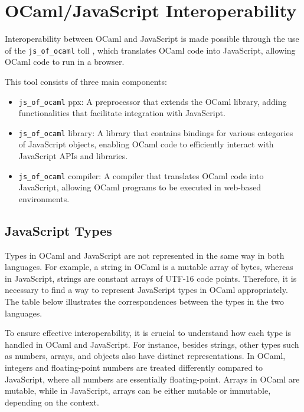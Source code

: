 \section{OCaml/JavaScript Interoperability}
\label{sec:ocaml_javascript_interoperability}


Interoperability between OCaml and JavaScript is made possible through the use of the \texttt{js\_of\_ocaml} toll \cite{demange2012} ,
which translates OCaml code into JavaScript, allowing OCaml code to run in a browser.

This tool consists of three main components:

\begin{itemize}
    \item \texttt{js\_of\_ocaml} ppx: A preprocessor that extends the OCaml library, adding functionalities that facilitate integration with JavaScript.
    \item \texttt{js\_of\_ocaml} library: A library that contains bindings for various categories of JavaScript objects, enabling OCaml code to efficiently interact with JavaScript APIs and libraries.
    \item \texttt{js\_of\_ocaml} compiler: A compiler that translates OCaml code into JavaScript, allowing OCaml programs to be executed in web-based environments.
\end{itemize}




\subsection{JavaScript Types}
\label{ssec:javaScript_types}

Types in OCaml and JavaScript are not represented in the same way in both languages. For example, a string in OCaml is a mutable array 
of bytes, whereas in JavaScript, strings are constant arrays of UTF-16 code points. Therefore, it is necessary to find a way to represent 
JavaScript types in OCaml appropriately. The table below illustrates the correspondences between the types in the two languages.

To ensure effective interoperability, it is crucial to understand how each type is handled in OCaml and JavaScript. For instance, 
besides strings, other types such as numbers, arrays, and objects also have distinct representations. In OCaml, integers 
and floating-point numbers are treated differently compared to JavaScript, where all numbers are essentially floating-point. 
Arrays in OCaml are mutable, while in JavaScript, arrays can be either mutable or immutable, depending on the context.


